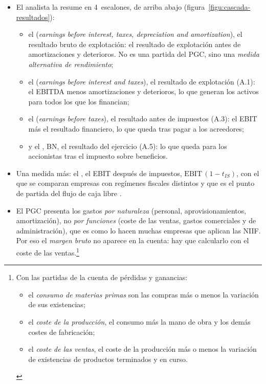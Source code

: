 \documentclass[11pt]{article}
\begin{document}
\begin{itemize}
\item El analista la resume en 4~escalones, de arriba abajo (figura~\ref{figu:cascada-resultados}):
  \begin{itemize}
  \item el  (\emph{earnings before interest, taxes, depreciation and amortization}), el resultado bruto de explotación: el resultado de explotación antes de amortizaciones y deterioros. No es una partida del PGC, sino una \emph{medida alternativa de rendimiento};
  \item el  (\emph{earnings before interest and taxes}), el resultado de explotación (A.1): el EBITDA menos amortizaciones y deterioros, lo que generan los activos para todos los que los financian;
  \item el  (\emph{earnings before taxes}), el resultado antes de impuestos (A.3): el EBIT más el resultado financiero, lo que queda tras pagar a los acreedores;
  \item y el , BN, el resultado del ejercicio (A.5): lo que queda para los accionistas tras el impuesto sobre beneficios.
  \end{itemize}
\item Una medida más: el , el EBIT después de impuestos, $\mathrm{EBIT}\,(1-t_{IS})$, con el que se comparan empresas con regímenes fiscales distintos y que es el punto de partida del flujo de caja libre .
\item El PGC presenta los gastos \emph{por naturaleza} (personal, aprovisionamientos, amortización), no \emph{por funciones} (coste de las ventas, gastos comerciales y de administración), que es como lo hacen muchas empresas que aplican las NIIF. Por eso el \emph{margen bruto} no aparece en la cuenta: hay que calcularlo con el coste de las ventas.\footnote{Con las partidas de la cuenta de pérdidas y ganancias:
\begin{itemize}
\item el \emph{consumo de materias primas} son las compras más o menos la variación de sus existencias;
\item el \emph{coste de la producción}, el consumo más la mano de obra y los demás costes de fabricación;
\item el \emph{coste de las ventas}, el coste de la producción más o menos la variación de existencias de productos terminados y en curso.
\end{itemize}}
\end{itemize}
\end{document}
